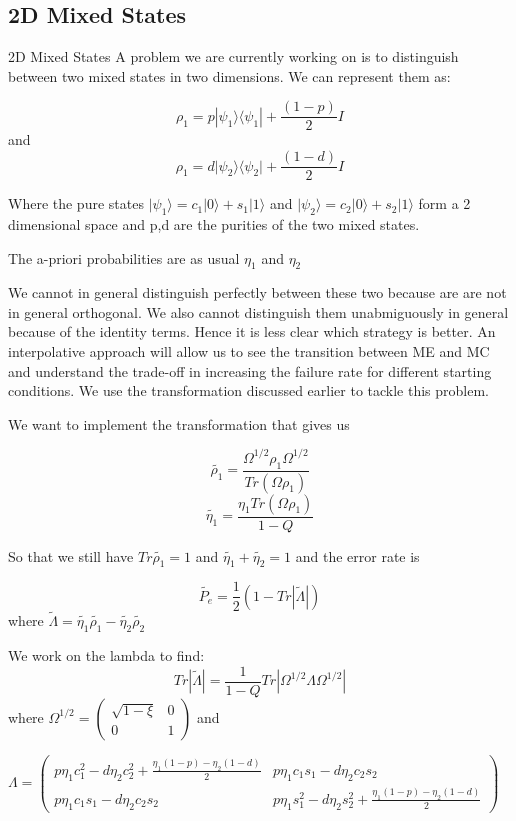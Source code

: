 \documentclass{beamer}
\newcommand{\abs}[1]{\left|{#1}\right|}
\newcommand{\br}[1]{\langle #1|}
\newcommand{\ke}[1]{|#1\rangle}
\newcommand{\td}[1]{\widetilde{#1}}
\begin{document}
\subsection{2D Mixed States}
\begin{frame}{2D Mixed States}
A problem we are currently working on is to distinguish between two mixed states in two dimensions. We can represent them as:

\[ \rho_1 = p \ke {\psi_1} \br {\psi_1}  + \frac{(1-p)}{2} I\] 
and
\[ \rho_1 = d \vert \psi_2 \rangle \langle \psi_2 \vert + \frac{(1-d)}{2} I\]

Where the pure states $\vert \psi_1 \rangle = c_1 \vert 0 \rangle + s_1 \vert 1 \rangle $ and $\vert \psi_2 \rangle = c_2 \vert 0 \rangle + s_2 \vert 1 \rangle $ form a 2 dimensional space and p,d are the purities of the two mixed states.

The a-priori probabilities are as usual $\eta_1$ and $\eta_2$
\end{frame}
\begin{frame}
We cannot in general distinguish perfectly between these two because are are not in general orthogonal. We also cannot distinguish them unabmiguously in general because of the identity terms. Hence it is less clear which strategy is better.  An interpolative approach will allow us to see the transition between ME and MC and understand the trade-off in increasing the failure rate for different starting conditions.  We use the transformation discussed earlier to tackle this problem.
\end{frame}
\begin{frame}
We want to implement the transformation that gives us

\[ \td {\rho_1} = \frac{\Omega^{1/2} \rho_1 \Omega^{1/2}}{Tr(\Omega \rho_1)} \]
\[ \td {\eta_1} = \frac{\eta_1 Tr (\Omega \rho_1)}{1-Q}\] 

So that we still have $Tr \td {\rho_1} = 1 $ and $\td {\eta_1 } + \td {\eta_2} = 1$
and the error rate is

\[\td{P_e} = \frac{1}{2}(1 - Tr \abs{\td{\Lambda}})\]
where $\td{\Lambda} = \td{\eta_1}\td{\rho_1} - \td{\eta_2}\td{\rho_2}$
\end{frame}
\begin{frame}
We work on the lambda to find:
\[Tr \abs{\td{\Lambda}} = \frac{1}{1-Q} Tr \abs{\Omega^{1/2}\Lambda \Omega^{1/2}}\]
where $\Omega^{1/2} =  \left( \begin{array}{cc}
\sqrt{1- \xi} & 0 \\
0 & 1 \end{array} \right)$ and

$\Lambda = \left( \begin{array}{cc}
{p\eta_1c_1^2-d\eta_2c_2^2 + \frac{\eta_1(1-p) -\eta_2(1-d)}{2}} &{ p\eta_1c_1s_1-d\eta_2c_2s_2} \\
{p\eta_1c_1s_1-d\eta_2c_2s_2} & {p\eta_1s_1^2-d\eta_2s_2^2 + \frac{\eta_1(1-p) -\eta_2(1-d)}{2}}\end{array} \right)$ 

\end{frame}
\end{document}
